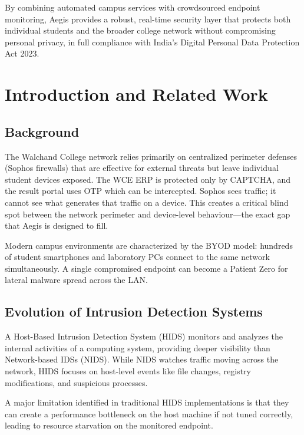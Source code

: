 \documentclass[12pt,a4paper]{report}
\begin{document}
By combining automated campus services with crowdsourced endpoint monitoring, Aegis provides a robust, real-time security layer that protects both individual students and the broader college network without compromising personal privacy, in full compliance with India's Digital Personal Data Protection Act 2023.

\chapter{Introduction and Related Work}

\section{Background}

The Walchand College network relies primarily on centralized perimeter defenses (Sophos firewalls) that are effective for external threats but leave individual student devices exposed. The WCE ERP is protected only by CAPTCHA, and the result portal uses OTP which can be intercepted. Sophos sees traffic; it cannot see what generates that traffic on a device. This creates a critical blind spot between the network perimeter and device-level behaviour—the exact gap that Aegis is designed to fill.

Modern campus environments are characterized by the BYOD model: hundreds of student smartphones and laboratory PCs connect to the same network simultaneously. A single compromised endpoint can become a Patient Zero for lateral malware spread across the LAN.

\section{Evolution of Intrusion Detection Systems}

A Host-Based Intrusion Detection System (HIDS) monitors and analyzes the internal activities of a computing system, providing deeper visibility than Network-based IDSs (NIDS). While NIDS watches traffic moving across the network, HIDS focuses on host-level events like file changes, registry modifications, and suspicious processes.

A major limitation identified in traditional HIDS implementations is that they can create a performance bottleneck on the host machine if not tuned correctly, leading to resource starvation on the monitored endpoint.
\end{document}
